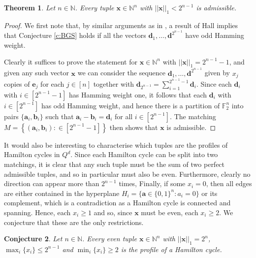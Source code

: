 \documentclass{article}
\newtheorem{theorem}{Theorem}[section]
\newtheorem{conjecture}[theorem]{Conjecture}
\begin{document}
\begin{theorem}\label{c:admissible}
Let $n \in \mathbb{N}$. Every tuple $\bm{x} \in \mathbb{N}^n$ with $||\bm{x}||_1 < 2^{n-1}$ is admissible.
\end{theorem}
\begin{proof}
We first note that, by similar arguments as in \cite[Remark 5.4]{HKAES23}, a result of Hall \cite{HJR52} implies that Conjecture \ref{c:BGS} holds if all the vectors $\bm{d}_1,\ldots,\bm{d}^{2^{n-1}}$ have odd Hamming weight. 

Clearly it suffices to prove the statement for $\bm{x} \in \mathbb{N}^n$ with $||\bm{x}||_1 = 2^{n-1}-1$, and given any such vector $\bm{x}$ we can consider the sequence $\bm{d}_1,\ldots,\bm{d}^{2^{n-1}}$ given by $x_j$ copies of $\bm{e}_j$ for each $j \in [n]$ together with $\bm{d}_{2^{n-1}} = \sum_{i=1}^{2^{n-1}-1} \bm{d}_i$. Since each $\bm{d}_i$ with $i \in \left[2^{n-1}-1\right]$ has Hamming weight one, it follows that each $\bm{d}_i$ with $i\in \left[2^{n-1}\right]$ has odd Hamming weight, and hence there is a partition of $\mathbb{F}^n_2$ into pairs $\{\bm{a}_i,\bm{b}_i\}$ such that $\bm{a}_i - \bm{b}_i = \bm{d}_i$ for all $i \in \left[2^{n-1}\right]$. The matching $
M = \left\{ (\bm{a}_i,\bm{b}_i) \colon  \in \left[2^{n-1}-1\right]\right\}$ then shows that $\bm{x}$ is admissible.
\end{proof}


It would also be interesting to characterise which tuples are the profiles of Hamilton cycles in $Q^d$.
Since each Hamilton cycle can be split into two matchings, it is clear that any such tuple must be the sum of two perfect admissible tuples, and so in particular must also be even. Furthermore, clearly no direction can appear more than $2^{n-1}$ times, Finally, if some $x_i=0$, then all edges are either contained in the hyperplane $H_i =\{ \bm{a} \in \{0,1\}^n \colon a_i=0\}$ or its complement, which is a contradiction as a Hamilton cycle is connected and spanning. Hence, each $x_i \geq 1$ and so, since $\bm{x}$ must be even, each $x_i \geq 2$. We conjecture that these are the only restrictions.
\begin{conjecture}\label{c:hamiltonian}
Let $n \in \mathbb{N}$. Every even tuple $\bm{x} \in \mathbb{N}^n$ with $||\bm{x}||_1 = 2^n$, $\max_i \{x_i\} \leq 2^{n-1}$ and $\min_i \{x_i\} \geq 2$ is the profile of a Hamilton cycle.
\end{conjecture}
\end{document}
